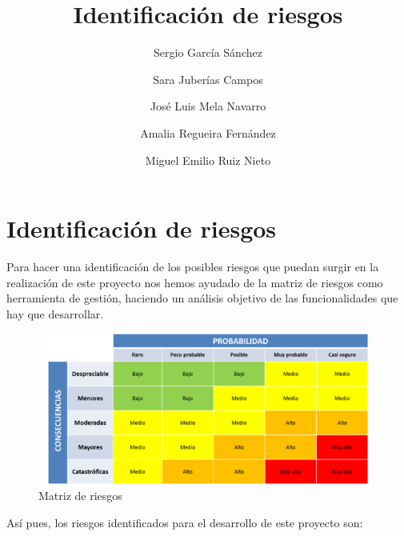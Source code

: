 \documentclass[a4paper,11pt]{report}
\begin{document}
\title{Identificación de riesgos}
\author{
		Sergio García Sánchez
		\and
		Sara Juberías Campos
		\and
		José Luis Mela Navarro
		\and
		Amalia Regueira Fernández
		\and
		Miguel Emilio Ruiz Nieto
	}

\maketitle
\section*{Identificación de riesgos}

Para hacer una identificación de los posibles riesgos que puedan surgir en la realización
de este proyecto nos hemos ayudado de la matriz de riesgos como herramienta de gestión, haciendo un análisis objetivo de las funcionalidades que hay que desarrollar.

\begin{figure}[h]
    \centering
    \includegraphics[height=5cm, width=12cm]{matriz_riesgos.png}
    \caption{Matriz de riesgos}
\end{figure}

Así pues, los riesgos identificados para el desarrollo de este proyecto son:
\end{document}
